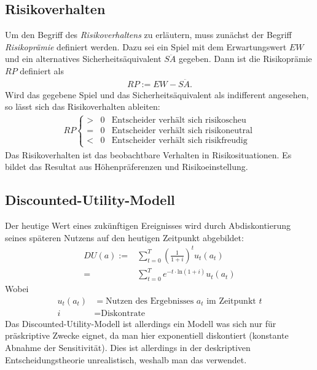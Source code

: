 \documentclass{panikzettel}
\begin{document}
\subsection{Risikoverhalten}
Um den Begriff des \textit{Risikoverhaltens} zu erläutern, muss zunächst der Begriff \textit{Risikoprämie} definiert werden. Dazu sei ein Spiel mit dem Erwartungswert $ EW $ und ein alternatives Sicherheitsäquivalent $ S\ddot{A} $ gegeben. Dann ist die Risikoprämie $ RP $ definiert als
\begin{align*}
	RP := EW - S\ddot{A}.
\end{align*}
Wird das gegebene Spiel und das Sicherheitsäquivalent als indifferent angesehen, so lässt sich das Risikoverhalten ableiten:
\begin{align*}
	RP \left\lbrace \begin{array}{ccl}
	> & 0 & \text{Entscheider verhält sich risikoscheu}\\
	= & 0 & \text{Entscheider verhält sich risikoneutral}\\
	< & 0 & \text{Entscheider verhält sich risikfreudig}
	\end{array}\right.
\end{align*}
Das Risikoverhalten ist das beobachtbare Verhalten in Risikosituationen. Es bildet das Resultat aus Höhenpräferenzen und Risikoeinstellung.

\subsection{Discounted-Utility-Modell} \label{sec:du}
Der heutige Wert eines zukünftigen Ereignisses wird durch Abdiskontierung seines späteren Nutzens auf den heutigen Zeitpunkt abgebildet:
\begin{align*}
	DU(a) :=& \sum_{t=0}^{T} \left(\frac{1}{1+i}\right)^t u_t(a_t) \\
	=& \sum_{t=0}^{T} e^{-t\cdot \text{ln}(1+i)} u_t(a_t)
\end{align*}
Wobei
\begin{align*}
	u_t(a_t) &= \text{Nutzen des Ergebnisses } a_t \text{ im Zeitpunkt } t\\
	i &= \text{Diskontrate}
\end{align*}
Das Discounted-Utility-Modell ist allerdings ein Modell was sich nur für präskriptive Zwecke eignet, da man hier exponentiell diskontiert (konstante Abnahme der Sensitivität). Dies ist allerdings in der deskriptiven Entscheidungstheorie unrealistisch, weshalb man das  verwendet.
\end{document}
